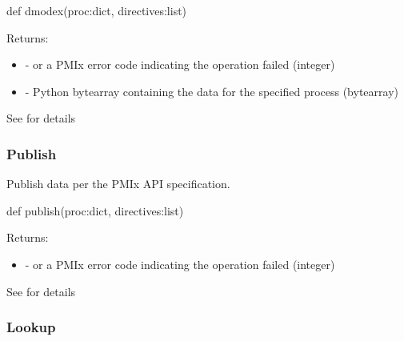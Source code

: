 \pyspecificstart
\begin{codepar}
def dmodex(proc:dict, directives:list)
\end{codepar}
\pyspecificend

\begin{arglist}
\end{arglist}

Returns:
\begin{itemize}
    \item {} -  or a \ac{PMIx} error code indicating the operation failed (integer)
    \item {} - Python bytearray containing the data for the specified process (bytearray)
\end{itemize}

See  for details

\subsubsection{Publish}

\summary

Publish data per the PMIx API specification.

\format

\pyspecificstart
\begin{codepar}
def publish(proc:dict, directives:list)
\end{codepar}
\pyspecificend

\begin{arglist}
\end{arglist}

Returns:
\begin{itemize}
    \item {} -  or a \ac{PMIx} error code indicating the operation failed (integer)
\end{itemize}

See  for details


\subsubsection{Lookup}

